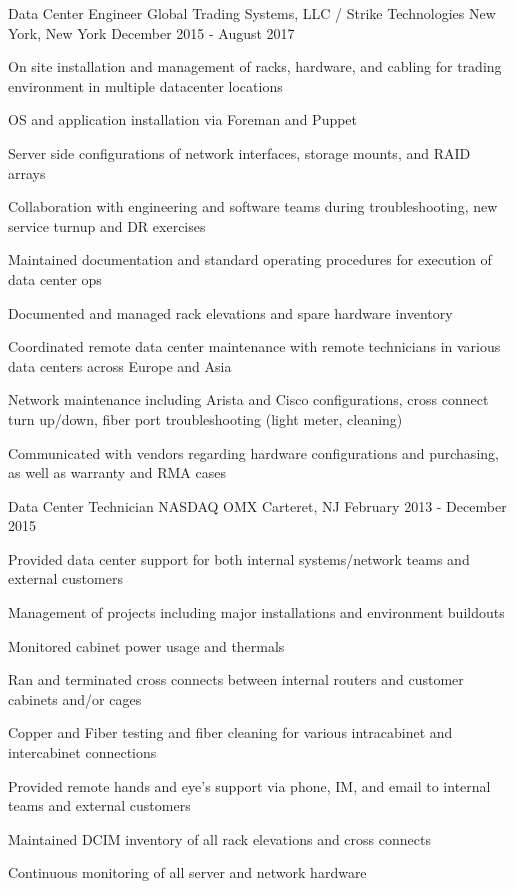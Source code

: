 \begin{cventries}
	\cventry
	{Data Center Engineer}
	{Global Trading Systems, LLC / Strike Technologies}
	{New York, New York}
	{December 2015 - August 2017}
	{
		\begin{cvitems}
		\item {On site installation and management of racks, hardware, and cabling for trading environment in multiple datacenter locations}
		\item {OS and application installation via Foreman and Puppet}
		\item {Server side configurations of network interfaces, storage mounts, and RAID arrays}
		\item {Collaboration with engineering and software teams during troubleshooting, new service turnup and DR exercises}
		\item {Maintained documentation and standard operating procedures for execution of data center ops}
		\item {Documented and managed rack elevations and spare hardware inventory}
		\item {Coordinated remote data center maintenance with remote technicians in various data centers across Europe and Asia}
		\item {Network maintenance including Arista and Cisco configurations, cross connect turn up/down, fiber port troubleshooting (light meter, cleaning)}
  		\item {Communicated with vendors regarding hardware configurations and purchasing, as well as warranty and RMA cases}
		\end{cvitems}
	}


	\cventry
	{Data Center Technician}
	{NASDAQ OMX}
	{Carteret, NJ}
	{February 2013 - December 2015}
	{
		\begin{cvitems}
		\item {Provided data center support for both internal systems/network teams and external customers}
		\item {Management of projects including major installations and environment buildouts}
  		\item {Monitored cabinet power usage and thermals}
		\item {Ran and terminated cross connects between internal routers and customer cabinets and/or cages}
		\item {Copper and Fiber testing and fiber cleaning for various intracabinet and intercabinet connections}
		\item {Provided remote hands and eye's support via phone, IM, and email to internal teams and external customers}
		\item {Maintained DCIM inventory of all rack elevations and cross connects}
		\item {Continuous monitoring of all server and network hardware}
		\end{cvitems}
	}

\end{cventries}

